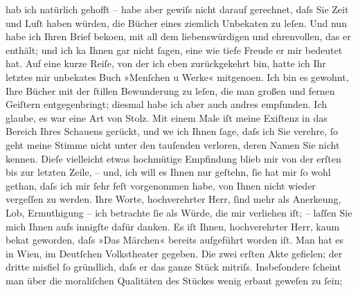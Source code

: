 \begin{ledgroupsized}[t]{13cm}
               hab ich natürlich gehofft – habe aber gewiſs nicht darauf gerechnet, daſs Sie Zeit
               und Luſt haben würden, die Bücher eines ziemlich Unbeka{\geminationn}ten zu leſen. Und nun habe ich Ihren Brief beko{\geminationm}en,
               mit all dem liebens{\pb}würdigen und ehrenvollen, das
               er enthält; und ich ka{\geminationn} Ihnen gar nicht ſagen, eine wie
               tiefe Freude er mir bedeutet hat. Auf eine kurze Reiſe, von der ich eben
               zurückgekehrt bin, hatte ich Ihr letztes mir unbeka{\geminationn}tes
               Buch »Menſchen u Werke« mitgeno{\geminationm}en. Ich bin es gewohnt, Ihre Bücher mit der ſtillen
               Bewunderung zu leſen, die man großen und fernen Geiſtern entgegen{\pb}bringt; diesmal habe ich aber auch andres
               empfunden. Ich glaube, es war eine Art von Stolz. Mit einem Male iſt meine Exiſtenz
               in das Bereich Ihres Schauens gerückt, und we{\geminationn} ich Ihnen
               ſage, daſs ich Sie verehre, ſo geht meine Stimme nicht unter den tauſenden verloren,
               deren Namen Sie nicht kennen. Dieſe vielleicht etwas hochmütige Empfindung blieb mir
                  {\pb}von der erſten bis zur letzten Zeile, – und,
               ich will es Ihnen nur geſtehn, ſie hat mir ſo wohl gethan, daſs ich mir ſehr feſt
               vorgenommen habe, von Ihnen nicht wieder vergeſſen zu werden. Ihre Worte,
               hochverehrter Herr, ſind mehr als Anerke{\geminationn}ung, Lob,
               Ermuthigung – ich betrachte ſie als Würde, die mir verliehen iſt; – laſſen Sie mich
               Ihnen aufs innigſte dafür {\pb}danken.\pend
           \pstart
           Es iſt Ihnen, hochverehrter Herr, kaum beka{\geminationn}t geworden,
               daſs »Das Märchen« bereits aufgeführt worden
               iſt. Man hat es in Wien, im Deutſchen Volkstheater gegeben. Die zwei erſten Akte gefielen;
               der dritte misfiel ſo gründlich, daſs er das ganze Stück mitriſs. Insbeſondere
               ſcheint man über die moraliſchen Qualitäten des Stückes wenig erbaut geweſen zu ſein;

\end{ledgroupsized}
